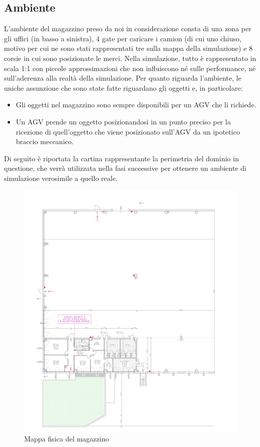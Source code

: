 \documentclass[12pt]{article}
\begin{document}
\subsection{Ambiente}
L'ambiente del magazzino preso da noi in considerazione consta di una zona per gli uffici (in basso a sinistra), 4 gate per caricare i camion (di cui uno chiuso, motivo per cui ne sono stati rappresentati tre sulla mappa della simulazione) e 8 corsie in cui sono posizionate le merci. Nella simulazione, tutto è rappresentato in scala 1:1 con piccole approssimazioni che non influiscono né sulle performance, né sull'aderenza alla realtà della simulazione.
Per quanto riguarda l'ambiente, le uniche assunzione che sono state fatte riguardano gli oggetti e, in particolare:
\begin{itemize}
    \item Gli oggetti nel magazzino sono sempre disponibili per un AGV che li richiede.
    \item Un AGV prende un oggetto posizionandosi in un punto preciso per la ricezione di quell’oggetto che viene posizionato sull’AGV da un ipotetico braccio meccanico.
\end{itemize}

\noindent Di seguito è riportata la cartina rappresentante la perimetria del dominio in questione, che verrà utilizzata nella fasi successive per ottenere un ambiente di simulazione verosimile a quello reale.

\begin{figure}
\includegraphics[width=\textwidth,height=\textheight,keepaspectratio]{Figures/Graphics/Zoom_Map.jpg}
\caption[Mappa fisica del magazzino]{Mappa fisica del magazzino}
\label{fig:Mappa_magazzino}
\end{figure}
\end{document}
